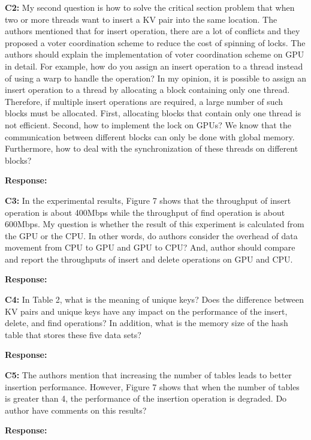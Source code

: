 \begin{shaded}
	\noindent\textbf{C2:} My second question is how to solve the critical section problem that when two or more threads want to insert a KV pair into the same location. The authors mentioned that for insert operation, there are a lot of conflicts and they proposed a voter coordination scheme to reduce the cost of spinning of locks. The authors should explain the implementation of voter coordination scheme on GPU in detail. For example, how do you assign an insert operation to a thread instead of using a warp to handle the operation? In my opinion, it is possible to assign an insert operation to a thread by allocating a block containing only one thread. Therefore, if multiple insert operations are required, a large number of such blocks must be allocated. First, allocating blocks that contain only one thread is not efficient. Second, how to implement the lock on GPUs? We know that the communication between different blocks can only be done with global memory. Furthermore, how to deal with the synchronization of these threads on different blocks? 
\end{shaded}

\noindent\textbf{Response:} 

\begin{shaded}
	\noindent\textbf{C3:} In the experimental results, Figure 7 shows that the throughput of insert operation is about 400Mbps while the throughput of find operation is about 600Mbps. My question is whether the result of this experiment is calculated from the GPU or the CPU. In other words, do authors consider the overhead of data movement from CPU to GPU and GPU to CPU? And, author should compare and report the throughputs of insert and delete operations on GPU and CPU.
\end{shaded}

\noindent\textbf{Response:} 

\begin{shaded}
	\noindent\textbf{C4:} In Table 2, what is the meaning of unique keys? Does the difference between KV pairs and unique keys have any impact on the performance of the insert, delete, and find operations? In addition, what is the memory size of the hash table that stores these five data sets?
\end{shaded}

\noindent\textbf{Response:} 


\begin{shaded}
	\noindent\textbf{C5:} The authors mention that increasing the number of tables leads to better insertion performance. However, Figure 7 shows that when the number of tables is greater than 4, the performance of the insertion operation is degraded. Do author have comments on this results?
\end{shaded}

\noindent\textbf{Response:} 